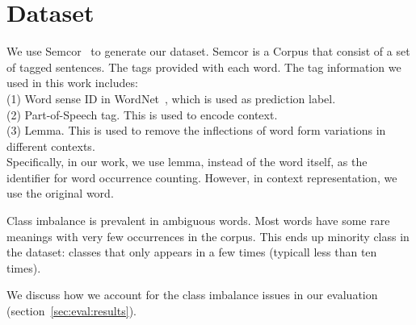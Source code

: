 \section{Dataset}
We use Semcor~\cite{semcor} to generate our dataset.
Semcor is a Corpus that consist of a set of tagged sentences.
The tags provided with each word.
The tag information we used in this work includes: \\
(1) Word sense ID in WordNet~\cite{wordnet}, which is used as prediction label.\\
(2) Part-of-Speech tag. This is used to encode context.\\
(3) Lemma. This is used to remove the inflections of word form variations in
different contexts.\\ 
Specifically, in our work, we use lemma, instead of the word
itself, as the identifier for word occurrence counting.
However, in context representation, we use the original word.

Class imbalance is prevalent in ambiguous words.
Most words have some rare meanings with very few occurrences in the corpus.
This ends up minority class in the dataset: classes that only appears in a few
times (typicall less than ten times).

We discuss how we account for the class imbalance issues in our evaluation
(section~\ref{sec:eval:results}).
